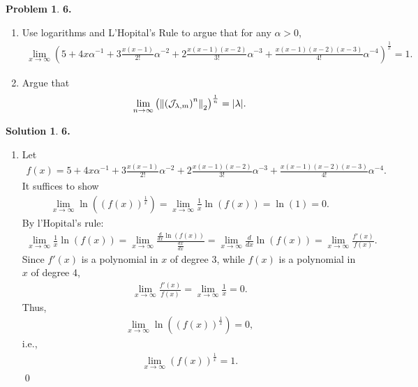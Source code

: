 \documentclass{article}
\theoremstyle{definition}
\newtheorem*{prob*}{Problem}
\newtheorem*{sln*}{Solution}
\newcommand{\jor}{\mathcal{J}}
\begin{document}
\newpage




\begin{prob*}\textbf{6. }\\
	\begin{enumerate}
		\item Use logarithms and L'Hopital's Rule to argue that for any $\alpha > 0$,
		\begin{align*}
		\lim\limits_{x\to \infty} \left(5 + 4x\alpha^{-1} + 3\frac{x(x-1)}{2!}\alpha^{-2}+ 2\frac{x(x-1)(x-2)}{3!}\alpha^{-3} + \frac{x(x-1)(x-2)(x-3)}{4!}\alpha^{-4}  \right)^{\frac{1}{x}} = 1.
		\end{align*}
		
		
		\item Argue that 
		\begin{align*}
		\lim\limits_{n\to\infty} \left(\norm{\left(\jor_{\lambda,m}\right)^n}_2\right)^{\frac{1}{n}} = \abs{\lambda}.
		\end{align*}
	\end{enumerate}


	\begin{sln*}\textbf{6.}
		$\,$\\
		\begin{enumerate}
			\item Let 
			\begin{align*}
			f(x) = 5 + 4x\alpha^{-1} + 3\frac{x(x-1)}{2!}\alpha^{-2}+ 2\frac{x(x-1)(x-2)}{3!}\alpha^{-3} + \frac{x(x-1)(x-2)(x-3)}{4!}\alpha^{-4}.
			\end{align*}
			It suffices to show 
			\begin{align*}
			\lim\limits_{x\to\infty}\ln\left( \left(f(x)\right)^\frac{1}{x}\right) = \lim\limits_{x\to\infty} \frac{1}{x}\ln(f(x)) = \ln(1) = 0.
			\end{align*}
			By l'Hopital's rule:
			\begin{align*}
			\lim\limits_{x\to\infty} \frac{1}{x}\ln(f(x)) = \lim\limits_{x\to\infty} \frac{\frac{d}{dx}\ln(f(x))}{\frac{dx}{dx}} =
			\lim\limits_{x\to\infty} \frac{d}{dx}\ln(f(x))
			= \lim\limits_{x\to\infty} \frac{f'(x)}{f(x)}.
			\end{align*}
			Since $f'(x)$ is a polynomial in $x$ of degree 3, while $f(x)$ is a polynomial in $x$ of degree 4, 
			\begin{align*}
			\lim\limits_{x\to\infty} \frac{f'(x)}{f(x)}= \lim\limits_{x\to\infty}\frac{1}{x} = 0.
			\end{align*}
			Thus, 
			\begin{align*}
			\lim\limits_{x\to\infty}\ln\left( \left(f(x)\right)^\frac{1}{x}\right) = 0,
			\end{align*}
			i.e.,
			\begin{align*}
			\lim\limits_{x\to\infty}\left(f(x)\right)^\frac{1}{x} = 1.
			\end{align*}\qed
			

\end{enumerate}
\end{sln*}
\end{prob*}
\end{document}
